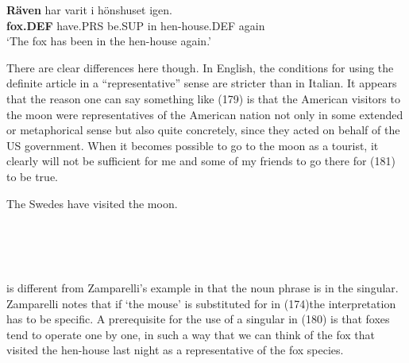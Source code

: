 

 \ea\label{}
\gll \textbf{Räven} har  varit  i  hönshuset  igen.\\


\textbf{fox.DEF} have.PRS  be.SUP  in  hen-house.DEF  again\\

\glt ‘The fox has been in the hen-house again.’

\z

There are clear differences here though. In English, the conditions for using the definite article in a “representative” sense are stricter than in Italian. It appears that the reason one can say something like (179) is that the American visitors to the moon were representatives of the American nation not only in some extended or metaphorical sense but also quite concretely, since they acted on behalf of the US government. When it becomes possible to go to the moon as a tourist, it clearly will not be sufficient for me and some of my friends to go there for (181) to be true.


\item 

\label{bkm:Ref94431191}The Swedes have visited the moon.



\ea%
    \label{ex:180}
    \\
    \gll\\
	\\
    \glt     \z

	 is different from Zamparelli’s example in that the noun phrase is in the singular. Zamparelli notes that if  ‘the mouse’ is substituted for in (174)\textstyleLinguisticExample{, }the interpretation has to be specific. A prerequisite for the use of a singular in (180) is that foxes tend to operate one by one, in such a way that we can think of the fox that visited the hen-house last night as a representative of the fox species. 

